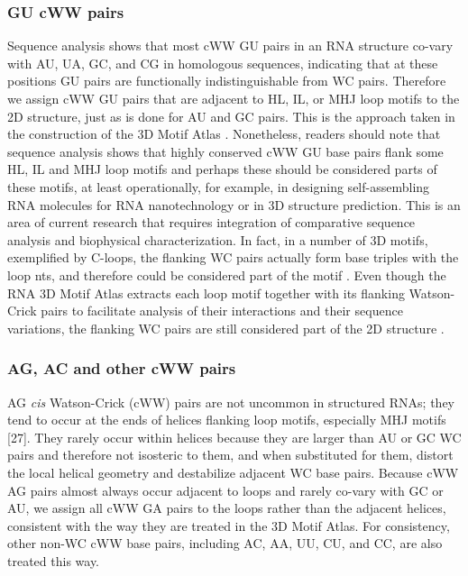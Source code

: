 \subsubsection{GU cWW pairs}

Sequence analysis shows that most cWW GU pairs in an RNA structure co-vary with
AU, UA, GC, and CG in homologous sequences, indicating that at these positions
GU pairs are functionally indistinguishable from WC pairs. Therefore we assign
cWW GU pairs that are adjacent to HL, IL, or MHJ loop motifs to the 2D
structure, just as is done for AU and GC pairs. This is the approach taken in
the construction of the 3D Motif Atlas \cite{Petrov2013}. Nonetheless, readers
should note that sequence analysis shows that highly conserved cWW GU base pairs
flank some HL, IL and MHJ loop motifs and perhaps these should be considered
parts of these motifs, at least operationally, for example, in designing
self-assembling RNA molecules for RNA nanotechnology or in 3D structure
prediction. This is an area of current research that requires integration of
comparative sequence analysis and biophysical characterization. In fact, in a
number of 3D motifs, exemplified by C-loops, the flanking WC pairs actually form
base triples with the loop nts, and therefore could be considered part of the
motif \cite{Lescoute2005}. Even though the RNA 3D Motif Atlas extracts each loop
motif together with its flanking Watson-Crick pairs to facilitate analysis of
their interactions and their sequence variations, the flanking WC pairs are
still considered part of the 2D structure \cite{Petrov2013}. 

\subsubsection{AG, AC and other cWW pairs}

AG \emph{cis} Watson-Crick (cWW) pairs are not uncommon in structured RNAs; they
tend to occur at the ends of helices flanking loop motifs, especially MHJ motifs
[27]. They rarely occur within helices because they are larger than AU or GC WC
pairs and therefore not isosteric to them, and when substituted for them,
distort the local helical geometry and destabilize adjacent WC base pairs.
Because cWW AG pairs almost always occur adjacent to loops and rarely co-vary
with GC or AU, we assign all cWW GA pairs to the loops rather than the adjacent
helices, consistent with the way they are treated in the 3D Motif Atlas. For
consistency, other non-WC cWW base pairs, including AC, AA, UU, CU, and CC, are
also treated this way.

